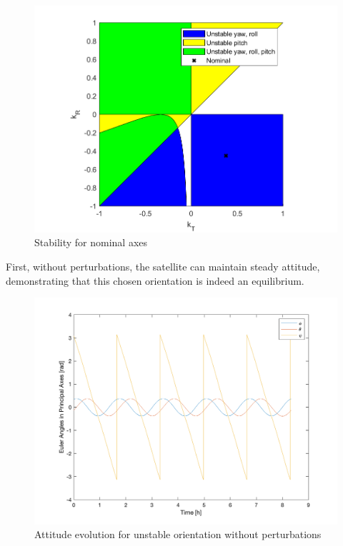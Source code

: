 \begin{figure}[H]
\centering
\includegraphics[scale=0.8]{Images/ps5_problem1a.png}
\caption{Stability for nominal axes}
\label{fig:ps5_problem1a}
\end{figure}

First, without perturbations, the satellite can maintain steady attitude, demonstrating that this chosen orientation is indeed an equilibrium.

\begin{figure}[H]
\centering
\includegraphics[scale=0.6]{Images/ps5_problem1b_angle_unperturbed.png}
\caption{Attitude evolution for unstable orientation without perturbations}
\label{fig:ps5_problem1b_angle_unperturbed}
\end{figure}


